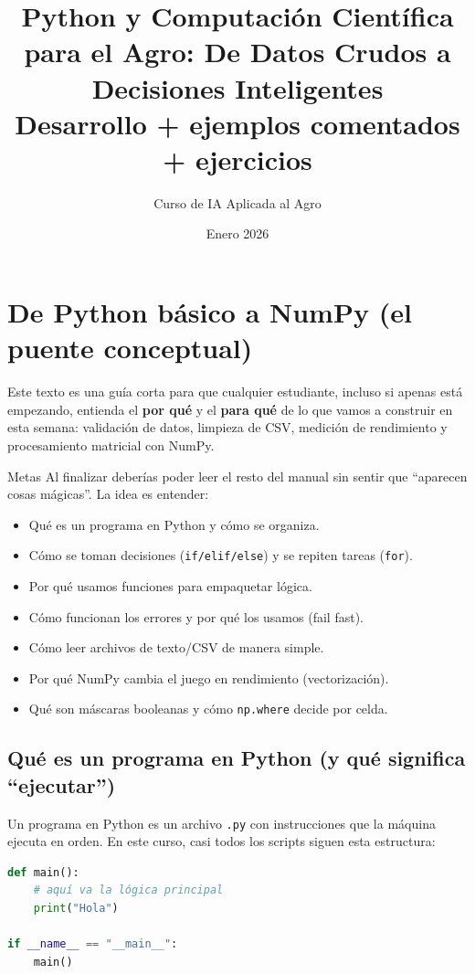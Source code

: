\documentclass[11pt, a4paper]{article}
\title{\textbf{Python y Computación Científica para el Agro: De Datos Crudos a Decisiones Inteligentes}\\
\large Desarrollo + ejemplos comentados + ejercicios}
\author{Curso de IA Aplicada al Agro}
\date{Enero 2026}
\begin{document}
\maketitle
\tableofcontents
\newpage
\section{ De Python básico a NumPy (el puente conceptual)}

Este texto es una guía corta para que cualquier estudiante, incluso si apenas está empezando, entienda el \textbf{por qué} y el \textbf{para qué} de lo que vamos a construir en esta semana: validación de datos, limpieza de CSV, medición de rendimiento y procesamiento matricial con NumPy.

\begin{conceptbox}{Metas}
Al finalizar deberías poder leer el resto del manual sin sentir que ``aparecen cosas mágicas''. La idea es entender:
\begin{itemize}
\item Qué es un programa en Python y cómo se organiza.
\item Cómo se toman decisiones (\texttt{if/elif/else}) y se repiten tareas (\texttt{for}).
\item Por qué usamos funciones para empaquetar lógica.
\item Cómo funcionan los errores y por qué los usamos (fail fast).
\item Cómo leer archivos de texto/CSV de manera simple.
\item Por qué NumPy cambia el juego en rendimiento (vectorización).
\item Qué son máscaras booleanas y cómo \texttt{np.where} decide por celda.
\end{itemize}
\end{conceptbox}

\subsection{Qué es un programa en Python (y qué significa ``ejecutar'')}
Un programa en Python es un archivo \texttt{.py} con instrucciones que la máquina ejecuta en orden.
En este curso, casi todos los scripts siguen esta estructura:

\begin{lstlisting}[language=Python, caption={Estructura típica de un script}]
def main():
    # aquí va la lógica principal
    print("Hola")

if __name__ == "__main__":
    main()
\end{lstlisting}
\end{document}
